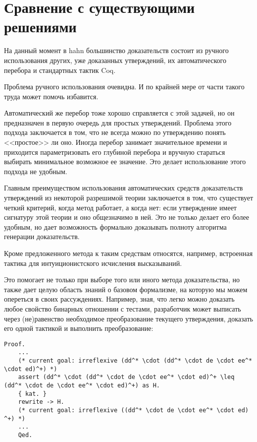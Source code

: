 \documentclass[times
              ,specification
              ,annotation
              ]{itmo-student-thesis}
\begin{document}
  \section{Сравнение с существующими решениями}

    На данный момент в hahn большинство доказательств состоит из ручного использования других, уже
    доказанных утверждений, их автоматического перебора и стандартных тактик Coq.

    Проблема ручного использования очевидна. И по крайней мере от части такого труда 
    может помочь избавится.

    Автоматический же перебор тоже хорошо справляется с этой задачей, но он предназначен в первую
    очередь для простых утверждений. Проблема этого подхода заключается в том, что не всегда можно по
    утверждению понять <<простое>> ли оно. Иногда перебор занимает значительное
    времени и приходится параметризовать его глубиной перебора и вручную стараться выбирать
    минимальное возможное ее значение. Это делает использование этого подхода не удобным.

    Главным преимуществом использования автоматических средств доказательств утверждений из некоторой
    разрешимой теории заключается в том, что существует четкий критерий, когда метод работает, а когда
    нет: если утверждение имеет сигнатуру этой теории и оно общезначимо в ней. Это не только делает его
    более удобным, но дает возможность формально доказывать полноту алгоритма генерации доказательств.

    Кроме предложенного метода к таким средствам относятся, например, встроенная тактика 
    \cite{coq_man} для интуиционистского исчисления высказываний.

    Это помогает не только при выборе того или иного метода доказательства, но также дает целую область
    знаний о базовом формализме, на которую мы можем опереться в своих рассуждениях. Например, зная, что
    легко можно доказать любое свойство бинарных отношении с тестами, разработчик может выписать через
    (не)равенство необходимое преобразование текущего утверждения, доказать его одной тактикой
     и выполнить преобразование:

    \begin{lstlisting}[float=false, gobble=4,
      caption={Пример доказательства вспомогательного утверждения, необходимого для преобразования, с
        помощью \textit{KAT}}, label={lst:arewrite}]
    Proof.
    ...
    (* current goal: irreflexive (dd^* \cdot (dd^* \cdot de \cdot ee^* \cdot ed)^+) *)
    assert (dd^* \cdot (dd^* \cdot de \cdot ee^* \cdot ed)^+ \leq (dd^* \cdot de \cdot ee^* \cdot ed)^+) as H.
    { kat. }
    rewrite -> H.
    (* current goal: irreflexive ((dd^* \cdot de \cdot ee^* \cdot ed) ^+) *)
    ...
    Qed.
    \end{lstlisting}
\end{document}
